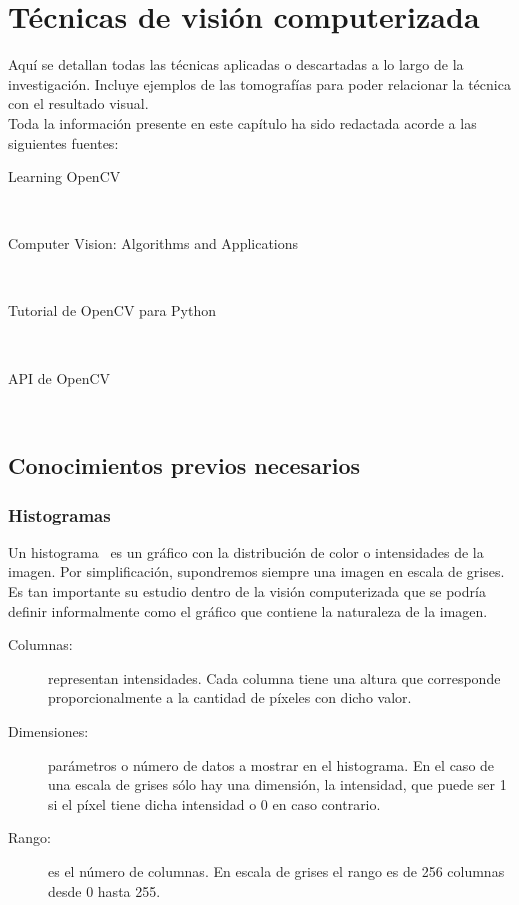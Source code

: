 \chapter{Técnicas de visión computerizada}
Aquí se detallan todas las técnicas aplicadas o descartadas a lo largo
de la investigación. Incluye ejemplos de las tomografías para poder
relacionar la técnica con el resultado visual.\\
Toda la información presente en este capítulo ha sido redactada acorde
a las siguientes fuentes:
\begin{description}
\item[Learning OpenCV]~\citep*{opencv_book-bib}
\item[Computer Vision: Algorithms and
  Applications]~\citep*{szeliski2010computer}
\item[Tutorial de OpenCV para Python]~\citep*{opencv_tutorial-bib}
\item[API de OpenCV]~\citep*{opencv_api-bib}
\end{description}

\section{Conocimientos previos necesarios}

\subsection{Histogramas}\label{tecnica:histogramas}
Un histograma~\citep*[Chapter 7. Histograms and
Matching]{opencv_book-bib} es un gráfico con la distribución de color
o intensidades de la imagen. Por simplificación, supondremos siempre
una imagen en escala de grises. Es tan importante su estudio dentro de
la visión computerizada que se podría definir informalmente como el
gráfico que contiene la naturaleza de la imagen.
\begin{description}
\item[Columnas:] representan intensidades. Cada columna tiene una
  altura que corresponde proporcionalmente a la cantidad de píxeles
  con dicho valor.
\item[Dimensiones:] parámetros o número de datos a mostrar en el
  histograma. En el caso de una escala de grises sólo hay una
  dimensión, la intensidad, que puede ser 1 si el píxel tiene dicha
  intensidad o 0 en caso contrario.
\item[Rango:] es el número de columnas. En escala de grises el rango
  es de 256 columnas desde 0 hasta 255.
\end{description}

